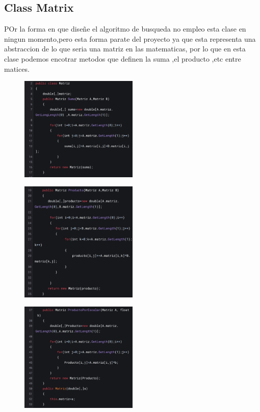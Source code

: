 \documentclass[a4paper,12pt]{article}
\begin{document}
\subsection*{Class Matrix}\label{sec:Matrix}

POr la forma en que diseñe el algoritmo de busqueda no empleo esta clase en ningun momento,pero esta forma parate del proyecto ya que esta representa una abstraccion de lo que seria una 
matriz en las matematicas, por lo que en esta clase podemos encotrar metodos que definen la suma ,el producto ,etc entre matices.

\begin{figure}[H]
    \centering
    \includegraphics[width=0.5\textwidth]{imagenes/4.jpg}
\end{figure}
\begin{figure}[H]
    \centering
    \includegraphics[width=0.5\textwidth]{imagenes/5.jpg}
\end{figure}
\begin{figure}[H]
    \centering
    \includegraphics[width=0.5\textwidth]{imagenes/6.jpg}
\end{figure}
\end{document}
